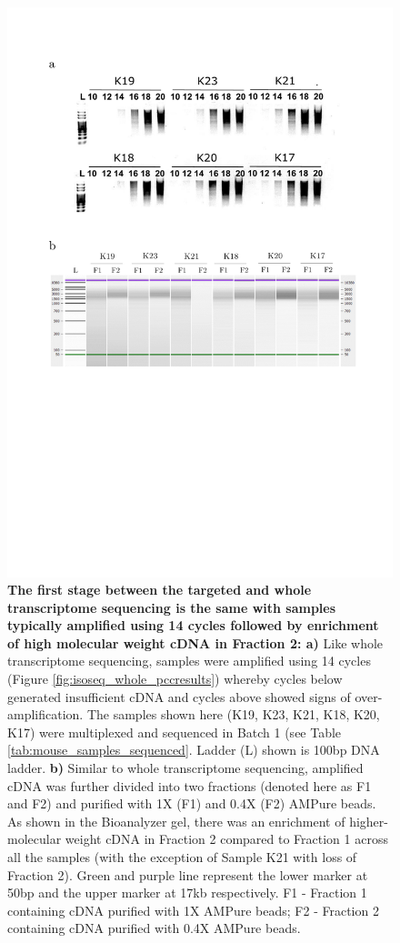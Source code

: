\begin{figure}[htp]
	\centering
	\vspace{20pt}
	\includegraphics[page=1,trim={0 16cm 0 4cm},clip,scale = 0.45]{Figures/TargetedLabResults.pdf}
	\captionsetup{width=0.95\textwidth}
	\caption[Iso-Seq Targeted Transcriptome - cDNA amplification and purification]%
	{\textbf{The first stage between the targeted and whole transcriptome sequencing is the same with samples typically amplified using 14 cycles followed by enrichment of high molecular weight cDNA in Fraction 2: a)} Like whole transcriptome sequencing, samples were amplified using 14 cycles (Figure \ref{fig:isoseq_whole_pccresults}) whereby cycles below generated insufficient cDNA and cycles above showed signs of over-amplification. The samples shown here (K19, K23, K21, K18, K20, K17) were multiplexed and sequenced in Batch 1 (see Table \ref{tab:mouse_samples_sequenced}. Ladder (L) shown is 100bp DNA ladder. \textbf{b)} Similar to whole transcriptome sequencing, amplified cDNA was further divided into two fractions (denoted here as F1 and F2) and purified with 1X (F1) and 0.4X (F2) AMPure beads. As shown in the Bioanalyzer gel, there was an enrichment of higher-molecular weight cDNA in Fraction 2 compared to Fraction 1 across all the samples (with the exception of Sample K21 with loss of Fraction 2). Green and purple line represent the lower marker at 50bp and the upper marker at 17kb respectively. F1 - Fraction 1 containing cDNA purified with 1X AMPure beads; F2 - Fraction 2 containing cDNA purified with 0.4X AMPure beads.}

\end{figure}

